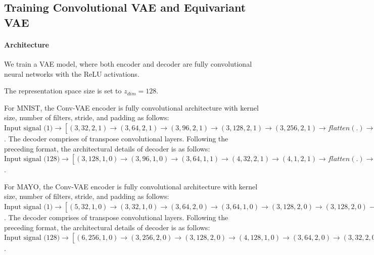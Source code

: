\subsection{Training Convolutional VAE and Equivariant VAE}

\paragraph{Architecture} We train a VAE model, where both encoder and decoder are fully convolutional neural networks with the ReLU activations. 

The representation space size is set to $z_{dim} = 128$. 

For MNIST, the Conv-VAE encoder is fully convolutional architecture with kernel size, number of filters, stride, and padding as follows: $\text{Input signal (1)} \rightarrow [(3, 32, 2, 1) \rightarrow (3, 64, 2, 1) \rightarrow (3, 96, 2, 1) \rightarrow (3, 128, 2, 1) \rightarrow (3, 256, 2, 1) \rightarrow flatten(.) \rightarrow (\mu_z, \log\sigma_z^2)]$. The decoder comprises of transpose convolutional layers. Following the preceding format, the architectural details of decoder is as follows: $\text{Input signal (128)} \rightarrow [(3, 128, 1, 0) \rightarrow (3, 96, 1, 0) \rightarrow (3, 64, 1, 1) \rightarrow (4, 32, 2, 1) \rightarrow (4, 1, 2, 1) \rightarrow flatten(.) \rightarrow (\mu_x)]$.

For MAYO, the Conv-VAE encoder is fully convolutional architecture with kernel size, number of filters, stride, and padding as follows: $\text{Input signal (1)} \rightarrow [(5, 32, 1, 0) \rightarrow (3, 32, 1, 0) \rightarrow (3, 64, 2, 0) \rightarrow (3, 64, 1, 0) \rightarrow (3, 128, 2, 0) \rightarrow (3, 128, 2, 0) \rightarrow (3, 256, 2, 0) \rightarrow (3, 256, 2, 0) \rightarrow (2, 256, 2, 0) \rightarrow flatten(.) \rightarrow (\mu_z, \log\sigma_z^2)]$. The decoder comprises of transpose convolutional layers. Following the preceding format, the architectural details of decoder is as follows: $\text{Input signal (128)} \rightarrow [(6, 256, 1, 0) \rightarrow (3, 256, 2, 0) \rightarrow (3, 128, 2, 0) \rightarrow (4, 128, 1, 0) \rightarrow (3, 64, 2, 0) \rightarrow (3, 32, 2, 0) \rightarrow (4, 32, 1, 0) \rightarrow (3, 1, 1, 0) \rightarrow flatten(.) \rightarrow (\mu_x)]$.


